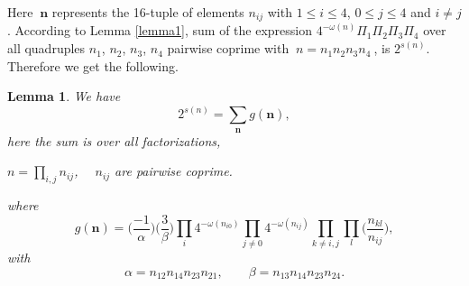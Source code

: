 \documentclass[11pt]{article}
\newcommand{\n}{\textbf{n}}
\newtheorem{lemma}[theorem]{Lemma}
\begin{document}
\noindent Here $\: \n$ represents the 16-tuple of elements $n_{ij}$ with $1\leq i\leq 4$, $0\leq j\leq 4$ and $i\neq j$. According to Lemma \ref{lemma1}, sum of the expression $4^{-\omega(n)}\Pi_{1}\Pi_{2}\Pi_{3}\Pi_{4}$ over all quadruples $n_{1}$, $n_{2}$, $n_{3}$, $n_{4}$ pairwise coprime with $\:n=n_{1}n_{2}n_{3}n_{4}\:$, is $2^{s(n)}$. Therefore we get the following.
\begin{lemma}\label{lemma3}
We have
$$2^{s(n)}=\sum\limits_{\n}g(\n),$$
here the sum is over all factorizations,
\begin{center}
$n=\prod\limits_{i,j}n_{ij}$, $\quad n_{ij}$ are pairwise coprime.
\end{center}
where
$$g(\n)=\biggl(\frac{-1}{\alpha}\biggr)\biggl(\frac{3}{\beta}\biggr)\prod\limits_{i}4^{-\omega(n_{i0})}\prod\limits_{j\neq 0}4^{-\omega(n_{ij})}\prod\limits_{k\neq i,j}\prod\limits_{l}\biggl(\frac{n_{kl}}{n_{ij}}\biggr),$$
with
$$\alpha=n_{12}n_{14}n_{23}n_{21},\qquad \beta=n_{13}n_{14}n_{23}n_{24}.$$   
\end{lemma}
\end{document}
